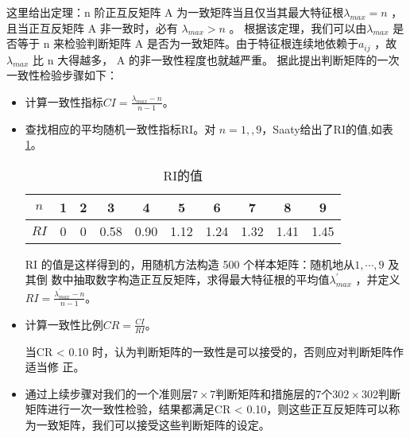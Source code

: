 \documentclass{cumcmthesis}
\begin{document}
这里给出定理：n 阶正互反矩阵 A 为一致矩阵当且仅当其最大特征根$\lambda_{max} = n$ ，且当正互反矩阵 A 非一致时，必有 $\lambda_{max}> n$ 。 根据该定理，我们可以由$\lambda_{max}$ 是否等于 n 来检验判断矩阵 A 是否为一致矩阵。由于特征根连续地依赖于$a_{ij}$ ，故 $\lambda_{max}$ 比 n 大得越多， A 的非一致性程度也就越严重。
据此提出判断矩阵的一次一致性检验步骤如下：
\begin{itemize}
    \item 计算一致性指标$CI = \frac{\lambda_{max}-n}{n-1}$。
    \item 查找相应的平均随机一致性指标RI。对 $n = 1,,9$，Saaty给出了RI的值,如表\ref{RIde}。
    \begin{table}[H]
        \label{tablesymbol}
        \centering
        \begin{tabular}{c|ccccccccc}   
        \hline 
        $n$  &  1 & 2 & 3 & 4 & 5 & 6 & 7 & 8 & 9\\
        \hline
        $RI$  &  0 & 0 & 0.58 & 0.90 & 1.12 & 1.24 & 1.32 & 1.41 & 1.45\\
        \hline
        \end{tabular}
        \caption{RI的值}
        \label{RIde}
    
    \end{table}
    RI 的值是这样得到的，用随机方法构造 500 个样本矩阵：随机地从$1,\cdots,9$ 及其倒
数中抽取数字构造正互反矩阵，求得最大特征根的平均值$\lambda^{'}_{max}$ ，并定义$RI = \frac{\lambda^{'}_{max}-n}{n-1}$。
    \item 计算一致性比例$CR = \frac{CI}{RI}$。
    
    当CR < 0.10 时，认为判断矩阵的一致性是可以接受的，否则应对判断矩阵作适当修
正。
    \item 通过上续步骤对我们的一个准则层$7 \times 7$判断矩阵和措施层的7个$302 \times 302$判断矩阵进行一次一致性检验，结果都满足CR < 0.10，则这些正互反矩阵可以称为一致矩阵，我们可以接受这些判断矩阵的设定。 
\end{itemize}
\end{document}
